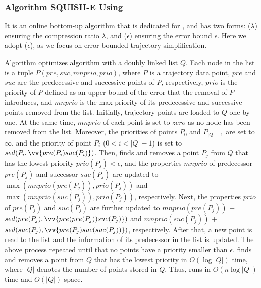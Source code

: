 \subsubsection{Algorithm SQUISH-E Using \sed~\cite{Muckell:Compression}}
It is an online bottom-up algorithm that is {dedicated for \sed}, and has two forms: \squishe($\lambda$) ensuring the compression ratio $\lambda$, and \squishe($\epsilon$) ensuring the \sed error bound $\epsilon$. Here we adopt \squishe($\epsilon$), as we focus on error bounded trajectory simplification.


Algorithm \squishe optimizes algorithm \tpa with a doubly linked list $Q$. Each node in the list is a tuple $P(pre, suc, mnprio, prio )$, where $P$ is a trajectory data point, $pre$ and $suc$ are the predecessive  and successive points of $P$, respectively,  $prio$ is the priority of $P$ defined as an upper bound of the \sed error that the removal of $P$ introduces, and $mnprio$ is the max priority of its predecessive and successive points removed from the list.
%
Initially, trajectory points are loaded to $Q$ one by one.
At the same time, $mnprio$ of each point is set to $zero$ as no node has been removed from the list.
Moreover, the priorities of points $P_0$ and $P_{|Q|-1}$ are set to $\infty$, and the priority of point $P_i$ ($0<i<|Q|-1$) is set to $sed(P_i, \vv{pre(P_{i})suc(P_{i})})$.
%
Then, \squishe finds and removes a point $P_j$ from $Q$ that has the lowest priority $prio(P_j)<\epsilon$, and the properties $mnprio$ of predecessor $pre(P_j)$ and successor $suc(P_j)$ are updated to $\max(mnprio(pre(P_j)), prio(P_j))$ and $\max(mnprio(suc(P_j)), prio(P_j))$, respectively.
Next, the properties $prio$ of $pre(P_j)$ and $suc(P_j)$ are further updated to $mnprio(pre(P_j))$ + $sed(pre(P_j), \vv{pre(pre(P_{j}))suc(P_{j})})$ and $mnprio(suc(P_j))$ + $sed(suc(P_j),\vv{pre(P_{j})suc(suc(P_{j}))})$, respectively.
%
After that, a new point is read to the list and the information of its predecessor in the list is updated.
%
The above process repeated until that no points have a priority smaller than $\epsilon$.
%
\squishe finds and removes a point from $Q$ that has the lowest priority in $O(\log |Q|)$ time, where $|Q|$ denotes the number of points stored in $Q$.
Thus, \squishe runs in $O(n\log |Q|)$ time and $O(|Q|)$ space.



